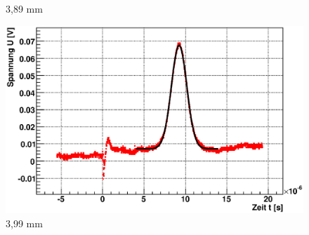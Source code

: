 \documentclass[12pt]{article}
\begin{document}
\begin{figure}[H]
\begin{minipage}{0.33\linewidth}
\small{3,89 mm}
\end{minipage}
\begin{minipage}{0.33\linewidth}
\centering 
\includegraphics[width=0.9\linewidth]{pictures/varDist/01.eps}
\small{3,99 mm}
\end{minipage}
\end{figure}
\end{document}
